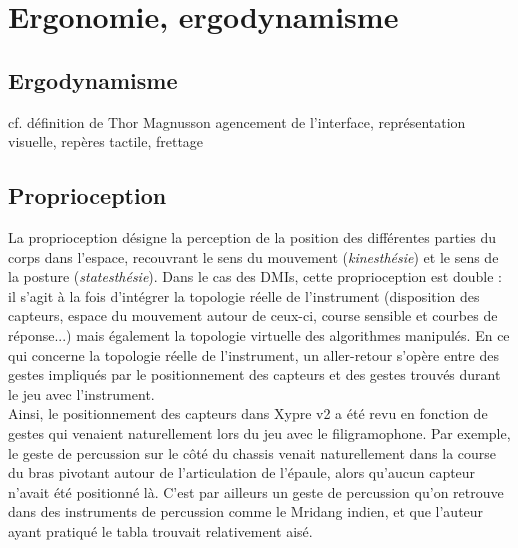 \section{Ergonomie, ergodynamisme}

\subsection{Ergodynamisme}

cf. définition de Thor Magnusson
agencement de l’interface, représentation visuelle, repères tactile, frettage


\subsection{Proprioception}

\noindent La proprioception désigne la perception de la position des différentes parties du corps dans l'espace, recouvrant le sens du mouvement (\textit{kinesthésie}) et le sens de la posture (\textit{statesthésie}). Dans le cas des \glspl{DMI}, cette proprioception est double : il s'agit à la fois d'intégrer la topologie réelle de l'instrument (disposition des capteurs, espace du mouvement autour de ceux-ci, course sensible et courbes de réponse...) mais également la topologie virtuelle des algorithmes manipulés. En ce qui concerne la topologie réelle de l'instrument, un aller-retour s'opère entre des gestes impliqués par le positionnement des capteurs et des gestes trouvés durant le jeu avec l'instrument.\\
\indent Ainsi, le positionnement des capteurs dans Xypre v2 a été revu en fonction de gestes qui venaient naturellement lors du jeu avec le filigramophone. Par exemple, le geste de percussion sur le côté du chassis venait naturellement dans la course du bras pivotant autour de l'articulation de l'épaule, alors qu'aucun capteur n'avait été positionné là. C'est par ailleurs un geste de percussion qu'on retrouve dans des instruments de percussion comme le Mridang indien, et que l'auteur ayant pratiqué le tabla trouvait relativement aisé.

 \cite{bin_hands_2017}

